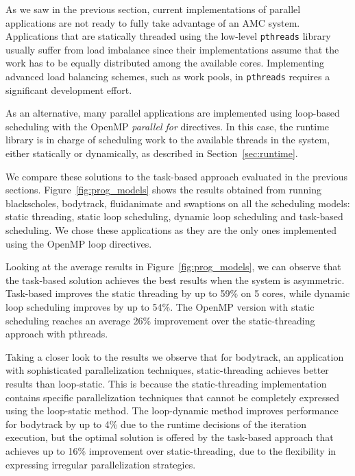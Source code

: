 As we saw in the previous section, current implementations of parallel applications are not ready to fully take advantage of an AMC system.
Applications that are statically threaded using the low-level \texttt{pthreads} library usually suffer from load imbalance since their implementations assume that the work has to be equally distributed among the available cores. 
Implementing advanced load balancing schemes, such as
work pools, in \texttt{pthreads} requires a significant development effort.

As an alternative, many parallel applications are implemented using loop-based scheduling with the 
OpenMP \emph{parallel for} directives. 
In this case, the runtime library is in charge of scheduling work to the available threads in the system, either statically or dynamically, as described in Section~\ref{sec:runtime}.

We compare these solutions to the task-based approach evaluated in the previous sections. 
Figure~\ref{fig:prog_models} shows the results obtained from running blackscholes, bodytrack, fluidanimate and swaptions on all the scheduling models: static threading, static loop scheduling, dynamic loop scheduling and task-based scheduling. 
We chose these applications as they are the only ones implemented using the OpenMP loop directives.

Looking at the average results in Figure~\ref{fig:prog_models}, we can observe that the task-based solution 
achieves the best results when the system is asymmetric. Task-based improves the static 
threading by up to 59\% on 5 cores, while dynamic loop scheduling improves by up to 54\%.
The OpenMP version with static scheduling reaches an average 26\% improvement over the static-threading approach with pthreads.

Taking a closer look to the results we observe that for bodytrack, an application with sophisticated parallelization techniques, static-threading achieves better results than loop-static.
This is because the static-threading implementation contains specific parallelization techniques that cannot be completely expressed using the loop-static method.
The loop-dynamic method improves performance for bodytrack by up to 4\% due to the runtime decisions of the iteration execution, but the optimal solution is offered by the task-based approach that achieves up to 16\% improvement over static-threading, due to the flexibility in expressing irregular parallelization strategies.
  
